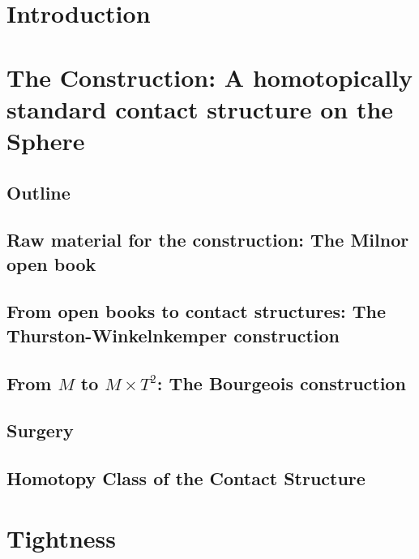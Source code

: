 \documentclass[oneside]{amsbook}
\begin{document}
\tableofcontents

\chapter{Introduction}


\chapter[Construction]{The Construction: A homotopically standard contact structure on the Sphere}\label{chap:construction}
\section{Outline}

\section[The Milnor open book]{Raw material for the construction: The Milnor open book} \label{sec:milnor}

\section[The Thurston-Winkelnkemper-construction]{From open books to contact structures: The Thurston-Winkelnkemper construction}

\section[The Bourgeois construction]{From $M$ to $M\times T^2$: The Bourgeois construction}


\section{Surgery}



\section[Homotopically standard]{Homotopy Class of the Contact Structure} \label{homotopically_standard}


\chapter{Tightness}\label{chap:tightness}


\end{document}
